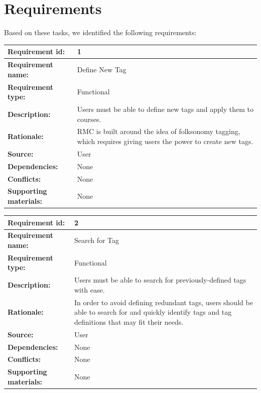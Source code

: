 \documentclass[12pt]{report}
\begin{document}
\section{Requirements}

Based on these tasks, we identified the following requirements:

\begin{tabular}{|l|p{7.5cm}|}
\hline
\textbf{Requirement id:}	& 1 \\
\hline
\textbf{Requirement name:}	&  Define New Tag \\
\hline
\textbf{Requirement type:}	& Functional \\
\hline
\textbf{Description:}	&  Users must be able to define new tags and apply them to courses. \\
\hline
\textbf{Rationale:}	&  RMC is built around the idea of folksonomy tagging, which requires giving users the power to create new tags. \\
\hline
\textbf{Source:}	& User \\
\hline
\textbf{Dependencies:}	& None \\
\hline
\textbf{Conflicts:}	& None \\
\hline
\textbf{Supporting materials:}	& None \\
\hline
\end{tabular}

\bigskip

\begin{tabular}{|l|p{7.5cm}|}
\hline
\textbf{Requirement id:}	& 2 \\
\hline
\textbf{Requirement name:}	&  Search for Tag \\
\hline
\textbf{Requirement type:}	& Functional \\
\hline
\textbf{Description:}	&  Users must be able to search for previously-defined tags with ease. \\
\hline
\textbf{Rationale:}	& In order to avoid defining redundant tags, users should be able to search for and quickly identify tags and tag definitions that may fit their needs. \\
\hline
\textbf{Source:}	& User \\
\hline
\textbf{Dependencies:}	& None \\
\hline
\textbf{Conflicts:}	& None \\
\hline
\textbf{Supporting materials:}	& None \\
\hline
\end{tabular}

\bigskip
\end{document}
